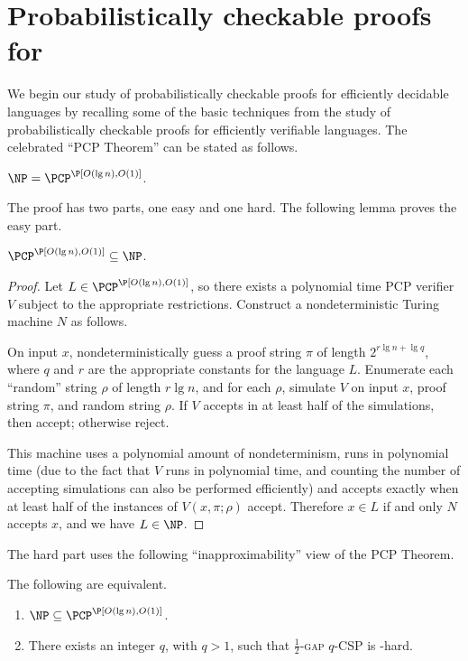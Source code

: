 \documentclass{article}
\begin{document}
\section{Probabilistically checkable proofs for \texorpdfstring{\NP}{NP}}

We begin our study of probabilistically checkable proofs for efficiently decidable languages by recalling some of the basic techniques from the study of probabilistically checkable proofs for efficiently verifiable languages.
The celebrated ``PCP Theorem'' can be stated as follows.

\begin{theorem}
  $\NP = \PCP^\P[O(\lg n), O(1)]$.
\end{theorem}

The proof has two parts, one easy and one hard.
The following lemma proves the easy part.

\begin{lemma}\label{lem:pcpinnp}
  $\PCP^\P[O(\lg n), O(1)] \subseteq \NP$.
\end{lemma}
\begin{proof}
  Let $L \in \PCP^\P[O(\lg n), O(1)]$, so there exists a polynomial time PCP verifier $V$ subject to the appropriate restrictions.
  Construct a nondeterministic Turing machine $N$ as follows.

  On input $x$, nondeterministically guess a proof string $\pi$ of length $2^{r \lg n + \lg q}$, where $q$ and $r$ are the appropriate constants for the language $L$.
  Enumerate each ``random'' string $\rho$ of length $r \lg  n$, and for each $\rho$, simulate $V$ on input $x$, proof string $\pi$, and random string $\rho$.
  If $V$ accepts in at least half of the simulations, then accept; otherwise reject.

  This machine uses a polynomial amount of nondeterminism, runs in polynomial time (due to the fact that $V$ runs in polynomial time, and counting the number of accepting simulations can also be performed efficiently) and accepts exactly when at least half of the instances of $V(x, \pi; \rho)$ accept.
  Therefore $x \in L$ if and only $N$ accepts $x$, and we have $L \in \NP$.  
\end{proof}

The hard part uses the following ``inapproximability'' view of the PCP Theorem.
\begin{proposition}\label{prop:equivalence}
  The following are equivalent.
  \begin{enumerate}
  \item $\NP \subseteq \PCP^\P[O(\lg n), O(1)]$.
  \item There exists an integer $q$, with $q > 1$, such that \textsc{$\frac{1}{2}$-gap $q$-CSP} is \NP-hard.
  \end{enumerate}
\end{proposition}
\end{document}
